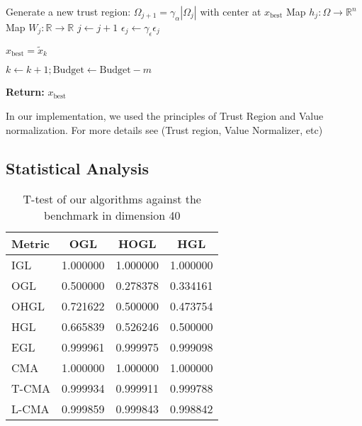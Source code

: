 \begin{algorithm}
\begin{algorithmic}
         \STATE Generate a new trust region: $\Omega_{j+1} = \gamma_{\alpha}|\Omega_j|$ with center at $x_{\text{best}}$
         \STATE Map $h_j: \Omega \to \mathbb{R}^n$
         \STATE Map $W_j: \mathbb{R} \to \mathbb{R}$
         \STATE $j \gets j + 1$
         \STATE $\epsilon_j \gets \gamma_{\epsilon} \epsilon_j$
      \ENDIF
      
         \STATE $x_{\text{best}} = \tilde{x}_k$
      \ENDIF
      
      \STATE $k \gets k + 1; \text{Budget} \gets \text{Budget} - m$
   \ENDWHILE

   \STATE \textbf{Return:} $x_{\text{best}}$
\end{algorithmic}
\end{algorithm}
In our implementation, we used the principles of Trust Region and Value normalization. For more details see \cite{sarafian2020explicit} (Trust region, Value Normalizer, etc)


\subsection{Statistical Analysis}

\begin{table}[H] 
    \centering
    \caption{T-test of our algorithms against the benchmark in dimension 40}
    \begin{tabular}{l|c|c|c}
        \textbf{Metric} & \textbf{OGL} & \textbf{HOGL} & \textbf{HGL} \\
        \hline
        IGL    & 1.000000 & 1.000000 & 1.000000 \\
        OGL    & 0.500000 & 0.278378 & 0.334161 \\
        OHGL   & 0.721622 & 0.500000 & 0.473754 \\
        HGL    & 0.665839 & 0.526246 & 0.500000 \\
        EGL    & 0.999961 & 0.999975 & 0.999098 \\
        CMA    & 1.000000 & 1.000000 & 1.000000 \\
        T-CMA  & 0.999934 & 0.999911 & 0.999788 \\
        L-CMA  & 0.999859 & 0.999843 & 0.998842 \\
    \end{tabular}
    \label{tab:t_test_comparison}
\end{table}


